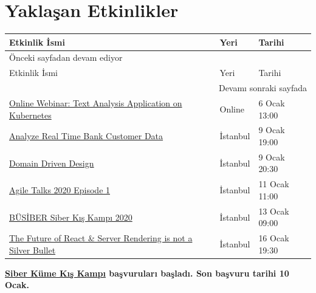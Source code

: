 \documentclass[11pt]{article}
\begin{document}
\section{Yaklaşan Etkinlikler}
\label{sec:orga8af200}
\begin{longtable}{|p{8cm}|l|l|}
\hline
Etkinlik İsmi & Yeri & Tarihi\\
\hline
\endfirsthead
\multicolumn{3}{l}{Önceki sayfadan devam ediyor} \\
\hline

Etkinlik İsmi & Yeri & Tarihi \\

\hline
\endhead
\hline\multicolumn{3}{r}{Devamı sonraki sayfada} \\
\endfoot
\endlastfoot
\hline
\href{https://www.meetup.com/IBMCloudTR/events/267424987/}{Online Webinar: Text Analysis Application on Kubernetes} & Online & 6 Ocak 13:00\\
\href{https://www.meetup.com/IBMCloudTR/events/267577304/}{Analyze Real Time Bank Customer Data} & İstanbul & 9 Ocak 19:00\\
\href{https://www.meetup.com/trendyol/events/267060271/}{Domain Driven Design} & İstanbul & 9 Ocak 20:30\\
\href{https://www.meetup.com/Agile-Bulusmalar/events/267522502/}{Agile Talks 2020 Episode 1} & İstanbul & 11 Ocak 11:00\\
\href{https://www.eventbrite.com/e/busiber-siber-ks-kamp-2020-registration-85540641361}{BÜSİBER Siber Kış Kampı 2020} & İstanbul & 13 Ocak 09:00\\
\href{https://kommunity.com/frontend-istanbul/events/the-future-of-react-server-rendering-is-not-a-silver-bullet}{The Future of React \& Server Rendering is not a Silver Bullet} & İstanbul & 16 Ocak 19:30\\
\hline
\end{longtable}

\textbf{\textbf{\href{https://kamp.siberkulupler.com/}{Siber Küme Kış Kampı} başvuruları başladı. Son başvuru tarihi 10 Ocak.}}
\end{document}
